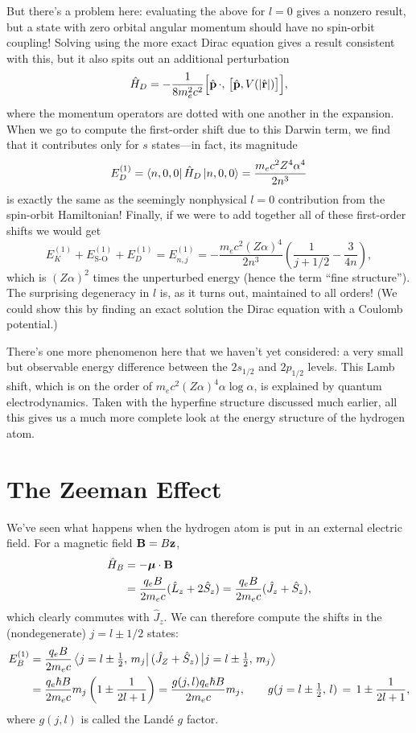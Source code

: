\documentclass[../p116main.tex]{subfiles}
\begin{document}
But there's a problem here: evaluating the above for $l=0$ gives a nonzero result, but a state with zero orbital angular momentum should have no spin-orbit coupling!
Solving using the more exact Dirac equation gives a result consistent with this, but it also spits out an additional perturbation
\[ \hat H_D = -\frac{1}{8m_e^2 c^2} \Big[ \hat{\mathbf{p}} \,\cdot, \, \big[ \hat{\mathbf{p}}, V(|\hat{\mathbf{r}}|) \big] \Big], \]
where the momentum operators are dotted with one another in the expansion.
When we go to compute the first-order shift due to this Darwin term, we find that it contributes only for $s$ states---in fact, its magnitude
\[ E_D^{(1)} = \left< n,0,0 \right| \hat H_D \left| n,0,0 \right> = \frac{m_e c^2 Z^{4} \alpha^{4}}{2n^3} \]
is exactly the same as the seemingly nonphysical $l=0$ contribution from the spin-orbit Hamiltonian!
Finally, if we were to add together all of these first-order shifts we would get
\[ E_K^{(1)} + E_\textrm{S-O}^{(1)} + E_D^{(1)} = E_{n,j}^{(1)} = -\frac{m_e c^2 (Z\alpha)^{4}}{2n^3} \left( \frac{1}{j + 1 / 2} - \frac{3}{4n} \right), \]
which is $(Z\alpha)^2$ times the unperturbed energy (hence the term ``fine structure'').
The surprising degeneracy in $l$ is, as it turns out, maintained to all orders!
(We could show this by finding an exact solution the Dirac equation with a Coulomb potential.)

There's one more phenomenon here that we haven't yet considered: a very small but observable energy difference between the $2s_{1 / 2}$ and $2p_{1 / 2}$ levels.
This Lamb shift, which is on the order of $m_e c^2 (Z\alpha)^{4} \alpha \log \alpha$, is explained by quantum electrodynamics.
Taken with the hyperfine structure discussed much earlier, all this gives us a much more complete look at the energy structure of the hydrogen atom.

\section{The Zeeman Effect}
We've seen what happens when the hydrogen atom is put in an external electric field.
For a magnetic field $\mathbf{B} = B\mathbf{z}$, \vspace{-10pt}
\begin{align*}
    \hat H_B &= -\bm \mu \cdot \mathbf{B} \\
    &= \frac{q_e B}{2m_e c} (\hat L_z + 2\hat S_z) = \frac{q_e B}{2m_e c} (\hat J_z + \hat S_z),
\end{align*}
which clearly commutes with $\hat J_z$.
We can therefore compute the shifts in the (nondegenerate) $j = l \pm 1 / 2$ states:
\begin{align*}
    E_B^{(1)} &= \frac{q_e B}{2m_e c} \left< j = l \pm \tfrac{1}{2}, \, m_j \right| (\hat J_Z + \hat S_z) \left| j = l \pm \tfrac{1}{2}, \, m_j \right> \\
    &= \frac{q_e \hbar B}{2m_e c} m_j \left( 1 \pm \frac{1}{2l + 1} \right) = \frac{g(j,l) q_e \hbar B}{2m_e c} m_j, \qquad g(j = l \pm \tfrac{1}{2}, \, l) \,=\, 1 \pm \frac{1}{2l+1},
\end{align*}
where $g(j,l)$ is called the Landé $g$ factor.
\end{document}
